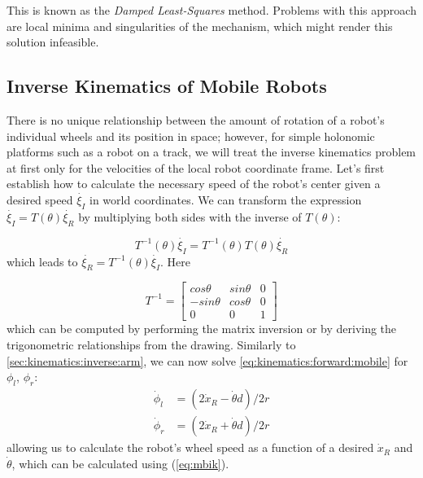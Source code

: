 This is known as the \textsl{Damped Least-Squares} method. Problems with this approach are local minima and singularities of the mechanism, which might render this solution infeasible.

\subsection{Inverse Kinematics of Mobile Robots}\label{sec:kinematics:ik:mobile}

There is no unique relationship between the amount of rotation of a robot's individual wheels and its position in space; however, for simple holonomic platforms such as a robot on a track, we will treat the inverse kinematics problem at first only for the velocities of the local robot coordinate frame.
%
Let's first establish how to calculate the necessary speed of the robot's center given a desired speed $ \dot{\xi_I}$ in world coordinates. We can transform the expression $ \dot{\xi_I}=T(\theta)\dot{\xi_R}$ by multiplying both sides with the inverse of $ T(\theta)$:

\begin{equation}\label{eq:mbik}
T^{-1}(\theta)\dot{\xi_I}=T^{-1}(\theta)T(\theta)\dot{\xi_R}
\end{equation}
which leads to $ \dot{\xi_R}=T^{-1}(\theta)\dot{\xi_I}$. Here

\begin{equation}
T^{-1}=\left[\begin{array}{ccc}cos \theta & sin \theta & 0 \\ -sin \theta & cos \theta & 0 \\ 0 & 0 & 1\end{array}\right]
\end{equation}
which can be computed by performing the matrix inversion or by deriving the trigonometric relationships from the drawing.  Similarly to \cref{sec:kinematics:inverse:arm}, we can now solve \cref{eq:kinematics:forward:mobile}
for $ \phi_l$, $ \phi_r$:
\begin{eqnarray}
\dot{\phi}_l &= (2\dot{x}_R - \dot{\theta}d)/2r\\
\nonumber
\dot{\phi}_r &= (2\dot{x}_R + \dot{\theta}d)/2r
\end{eqnarray}
allowing us to calculate the robot's wheel speed as a function of a desired $\dot{x}_R$ and $\dot{\theta}$, which can be calculated using (\ref{eq:mbik}).

